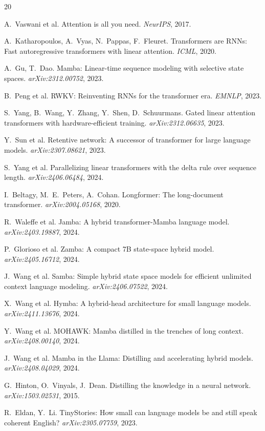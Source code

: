 \documentclass[11pt]{ctexart}
\begin{document}

\begin{thebibliography}{20}

 A.~Vaswani et al.
\newblock Attention is all you need.
\newblock \emph{NeurIPS}, 2017.

 A.~Katharopoulos, A.~Vyas, N.~Pappas, F.~Fleuret.
\newblock Transformers are RNNs: Fast autoregressive transformers with linear attention.
\newblock \emph{ICML}, 2020.

 A.~Gu, T.~Dao.
\newblock Mamba: Linear-time sequence modeling with selective state spaces.
\newblock \emph{arXiv:2312.00752}, 2023.

 B.~Peng et al.
\newblock RWKV: Reinventing RNNs for the transformer era.
\newblock \emph{EMNLP}, 2023.

 S.~Yang, B.~Wang, Y.~Zhang, Y.~Shen, D.~Schuurmans.
\newblock Gated linear attention transformers with hardware-efficient training.
\newblock \emph{arXiv:2312.06635}, 2023.

 Y.~Sun et al.
\newblock Retentive network: A successor of transformer for large language models.
\newblock \emph{arXiv:2307.08621}, 2023.

 S.~Yang et al.
\newblock Parallelizing linear transformers with the delta rule over sequence length.
\newblock \emph{arXiv:2406.06484}, 2024.

 I.~Beltagy, M.~E.~Peters, A.~Cohan.
\newblock Longformer: The long-document transformer.
\newblock \emph{arXiv:2004.05168}, 2020.

 R.~Waleffe et al.
\newblock Jamba: A hybrid transformer-Mamba language model.
\newblock \emph{arXiv:2403.19887}, 2024.

 P.~Glorioso et al.
\newblock Zamba: A compact 7B state-space hybrid model.
\newblock \emph{arXiv:2405.16712}, 2024.

 J.~Wang et al.
\newblock Samba: Simple hybrid state space models for efficient unlimited context language modeling.
\newblock \emph{arXiv:2406.07522}, 2024.

 X.~Wang et al.
\newblock Hymba: A hybrid-head architecture for small language models.
\newblock \emph{arXiv:2411.13676}, 2024.

 Y.~Wang et al.
\newblock MOHAWK: Mamba distilled in the trenches of long context.
\newblock \emph{arXiv:2408.00140}, 2024.

 J.~Wang et al.
\newblock Mamba in the Llama: Distilling and accelerating hybrid models.
\newblock \emph{arXiv:2408.04029}, 2024.

 G.~Hinton, O.~Vinyals, J.~Dean.
\newblock Distilling the knowledge in a neural network.
\newblock \emph{arXiv:1503.02531}, 2015.

 R.~Eldan, Y.~Li.
\newblock TinyStories: How small can language models be and still speak coherent English?
\newblock \emph{arXiv:2305.07759}, 2023.

\end{thebibliography}
\end{document}
